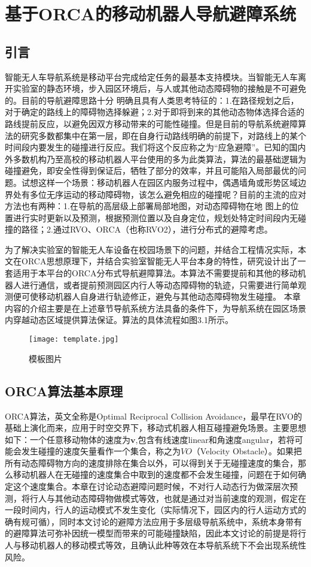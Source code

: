 \chapter{基于ORCA的移动机器人导航避障系统}

\section{引言}
智能无人车导航系统是移动平台完成给定任务的最基本支持模块。当智能无人车离开实验室的静态环境，步入园区环境后，与人或其他动态障碍物的接触是不可避免的。目前的导航避障思路十分
明确且具有人类思考特征的：1.在路径规划之后，对于确定的路线上的障碍物选择躲避；2.对于即将到来的其他动态物体选择合适的路线提前反应，以避免因双方移动带来的可能性碰撞。但是目前的导航系统避障算法的研究多数都集中在第一层，即在自身行动路线明确的前提下，对路线上的某个时间段内要发生的碰撞进行反应。我们将这个反应称之为“应急避障”。已知的国内外多数机构乃至高校的移动机器人平台使用的多为此类算法，算法的最基础逻辑为碰撞避免，即安全性得到保证后，牺牲了部分的效率，并且可能陷入局部最优的问题。试想这样一个场景：移动机器人在园区内服务过程中，偶遇墙角或形势区域边界处有多位无序运动的移动障碍物，该怎么避免相应的碰撞呢？目前的主流的应对方法也有两种：1.在导航的高层级上部署局部地图，对动态障碍物在地
图上的位置进行实时更新以及预测，根据预测位置以及自身定位，规划处特定时间段内无碰撞的路径；2.通过RVO、ORCA（也称RVO2），进行分布式的避障考虑。

为了解决实验室的智能无人车设备在校园场景下的问题，并结合工程情况实际，本文在ORCA思想原理下，并结合实验室智能无人平台本身的特性，研究设计出了一套适用于本平台的ORCA分布式导航避障算法。本算法不需要提前和其他的移动机器人进行通信，或者提前预测园区内行人等动态障碍物的轨迹，只需要进行简单观测便可使移动机器人自身进行轨迹修正，避免与其他动态障碍物发生碰撞。
本章内容的介绍主要是在上述章节导航系统方法具备的条件下，为导航系统在园区场景内穿越动态区域提供算法保证。算法的具体流程如图3.1所示。

\begin{figure}[ht]
\centering
\texttt{[image: template.jpg]}
\caption{模板图片}
\end{figure}

\section{ORCA算法基本原理}
ORCA算法，英文全称是Optimal Reciprocal Collision Avoidance，最早在RVO的基础上演化而来，应用于时空交界下，移动式机器人相互碰撞避免场景。主要思想如下：一个任意移动物体的速度为$\symbf{v}$,包含有线速度linear和角速度angular，若将可能会发生碰撞的速度矢量看作一个集合，称之为$VO$（Velocity Obstacle）。如果把所有动态障碍物方向的速度排除在集合以外，可以得到关于无碰撞速度的集合，那么移动机器人在无碰撞的速度集合中取到的速度都不会发生碰撞，问题在于如何确定这个速度集合。本章在讨论动态避障问题时候，不对行人动态行为做深层次预测，将行人与其他动态障碍物做模式等效，也就是通过对当前速度的观测，假定在一段时间内，行人的运动模式不发生变化（实际情况下，园区内的行人运动方式的确有规可循），同时本文讨论的避障方法应用于多层级导航系统中，系统本身带有的避障算法可弥补因统一模型而带来的可能碰撞缺陷，因此本文讨论的前提是将行人与移动机器人的移动模式等效，且确认此种等效在本导航系统下不会出现系统性风险。


